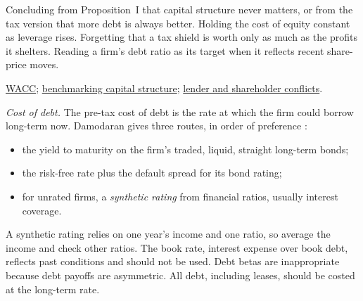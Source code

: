 \begin{qfmodel}
 Concluding from Proposition~I that capital structure never matters, or from the tax version that more debt is always better. Holding the cost of equity constant as leverage rises. Forgetting that a tax shield is worth only as much as the profits it shelters. Reading a firm's debt ratio as its target when it reflects recent share-price moves.

 \hyperref[meth:wacc-calculation]{WACC}; \hyperref[meth:capital-structure-benchmarking]{benchmarking capital structure}; \hyperref[def:stakeholder-claims]{lender and shareholder conflicts}.

\end{qfmodel}

\begin{qfmethod}\label{meth:cost-of-debt-equity-estimation}
 \emph{Cost of debt.} The pre-tax cost of debt is the rate at which the firm could borrow long-term now. Damodaran gives three routes, in order of preference \citep[pp.~137--141]{applied-corporate-finance-2014}:
\begin{itemize}
\item the yield to maturity on the firm's traded, liquid, straight long-term bonds;
\item the risk-free rate plus the default spread for its bond rating;
\item for unrated firms, a \emph{synthetic rating} from financial ratios, usually interest coverage.
\end{itemize}
A synthetic rating relies on one year's income and one ratio, so average the income and check other ratios. The book rate, interest expense over book debt, reflects past conditions and should not be used. Debt betas are inappropriate because debt payoffs are asymmetric. All debt, including leases, should be costed at the long-term rate.


\end{qfmethod}
